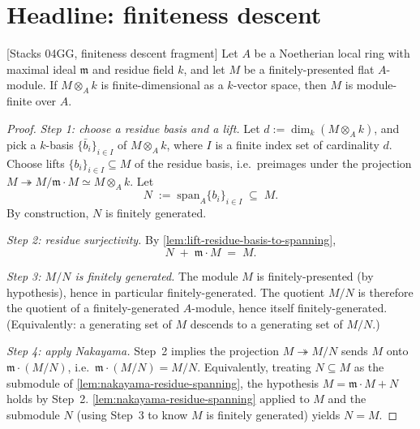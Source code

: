 \section{Headline: finiteness descent}

\begin{theorem}
  \label{thm:finite-of-finite-residue-flat-local}
  [Stacks 04GG, finiteness descent fragment]
  Let \(A\) be a Noetherian local ring with maximal ideal
  \(\mathfrak{m}\) and residue field \(k\), and let \(M\) be a
  finitely-presented flat \(A\)-module. If \(M \otimes_A k\) is
  finite-dimensional as a \(k\)-vector space, then \(M\) is
  module-finite over \(A\).
\end{theorem}

\begin{proof}
  \emph{Step 1: choose a residue basis and a lift.} Let
  \(d := \dim_k (M \otimes_A k)\), and pick a \(k\)-basis
  \(\{\bar b_i\}_{i \in I}\) of \(M \otimes_A k\), where \(I\) is a
  finite index set of cardinality \(d\). Choose lifts
  \(\{b_i\}_{i \in I} \subseteq M\) of the residue basis, i.e.\
  preimages under the projection
  \(M \twoheadrightarrow M / \mathfrak{m} \cdot M \simeq M \otimes_A k\).
  Let
  \[
    N \;:=\; \mathrm{span}_A \{b_i\}_{i \in I} \;\subseteq\; M.
  \]
  By construction, \(N\) is finitely generated.

  \emph{Step 2: residue surjectivity.} By
  \cref{lem:lift-residue-basis-to-spanning},
  \[
    N \;+\; \mathfrak{m} \cdot M \;=\; M.
  \]

  \emph{Step 3: \(M / N\) is finitely generated.} The module \(M\)
  is finitely-presented (by hypothesis), hence in particular
  finitely-generated. The quotient \(M/N\) is therefore the
  quotient of a finitely-generated \(A\)-module, hence itself
  finitely-generated. (Equivalently: a generating set of \(M\)
  descends to a generating set of \(M/N\).)

  \emph{Step 4: apply Nakayama.} Step~2 implies the projection
  \(M \twoheadrightarrow M/N\) sends \(M\) onto
  \(\mathfrak{m} \cdot (M/N)\), i.e.\
  \(\mathfrak{m} \cdot (M/N) = M/N\). Equivalently, treating
  \(N \subseteq M\) as the submodule of
  \cref{lem:nakayama-residue-spanning}, the hypothesis
  \(M = \mathfrak{m} \cdot M + N\) holds by Step~2.
  \cref{lem:nakayama-residue-spanning} applied to \(M\) and the
  submodule \(N\) (using Step~3 to know \(M\) is finitely generated)
  yields \(N = M\).


\end{proof}
